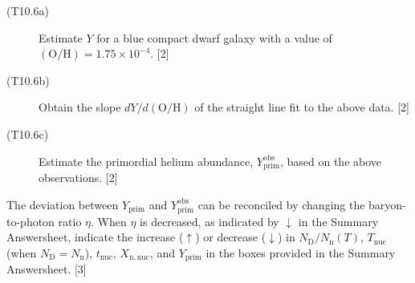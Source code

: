 \begin{description}

  \begin{description}
  \item[(T10.6a)] Estimate $Y$ for a blue compact dwarf galaxy with a value of
    $\mathrm{(O/H)} = 1.75 \times 10^{-4}$. \hfill[2]
  \item[(T10.6b)] Obtain the slope $dY/d\mathrm{(O/H)}$ of the straight line
    fit to the above data. \hfill[2]
  \item[(T10.6c)] Estimate the primordial helium abundance,
    $Y^{\mathrm{obs}}_{\mathrm{prim}}$, based on the above observations.
    \hfill[2]
  \end{description}
\item[(T10.7)] The deviation between $Y_{\mathrm{prim}}$ and
  $Y^{\mathrm{obs}}_{\mathrm{prim}}$ can be reconciled by changing the
  baryon-to-photon ratio $\eta$. When $\eta$ is decreased, as indicated by
  $\downarrow$ in the Summary Answersheet, indicate the increase ($\uparrow$)
  or decrease ($\downarrow$) in $N_{\mathrm{D}}/N_{\mathrm{n}}(T)$,
  $T_{\mathrm{nuc}}$ (when $N_{\mathrm{D}} = N_{\mathrm{n}}$),
  $t_{\mathrm{nuc}}$, $X_{\mathrm{n,nuc}}$, and $Y_{\mathrm{prim}}$ in the
  boxes provided in the Summary Answersheet. \hfill[3]
\end{description}
